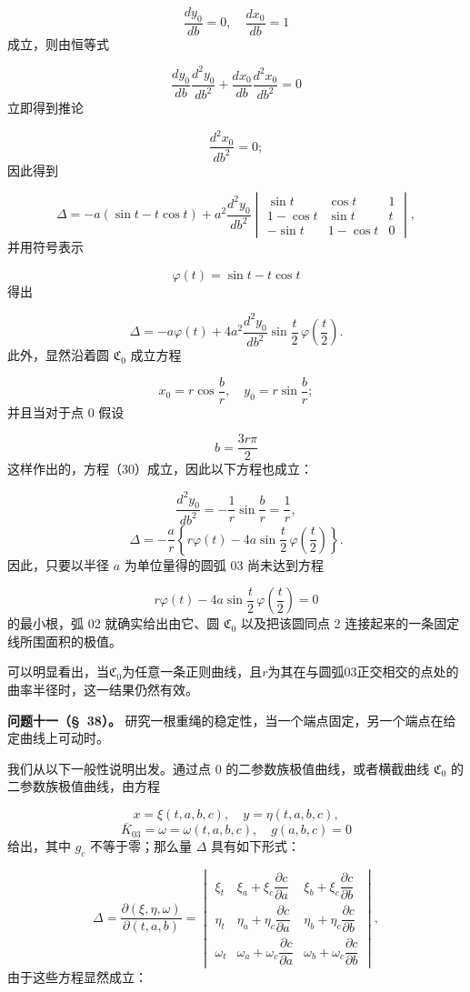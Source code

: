 \documentclass[11pt,a4paper,leqno]{article}
\begin{document}
\begin{equation}\tag{30}
\frac{dy_0}{db}=0,\quad \frac{dx_0}{db}=1
\end{equation}
成立，则由恒等式

\[
\frac{dy_0}{db}\frac{d^2y_0}{db^2}+\frac{dx_0}{db}\frac{d^2x_0}{db^2}=0
\]
立即得到推论

\[
\frac{d^2x_0}{db^2}=0;
\]
因此得到

\[
\Delta=-a(\sin t-t\cos t)+a^2\frac{d^2y_0}{db^2}\begin{vmatrix}
\sin t&\cos t&1\\
1-\cos t&\sin t&t\\
-\sin t&1-\cos t&0
\end{vmatrix},
\]
并用符号表示

\[
\varphi(t)=\sin t-t\cos t
\]
得出

\[
\Delta=-a\varphi(t)+4a^2\frac{d^2y_0}{db^2}\sin\frac{t}{2}\,\varphi\left(\frac{t}{2}\right).
\]
此外，显然沿着圆 $\mathfrak{C}_0$ 成立方程

\[
x_0=r\cos\frac{b}{r},\quad y_0=r\sin\frac{b}{r};
\]
并且当对于点 0 假设

\[
b=\frac{3r\pi}{2}
\]
这样作出的，方程（30）成立，因此以下方程也成立：

\[
\frac{d^2y_0}{db^2}=-\frac{1}{r}\sin\frac{b}{r}=\frac{1}{r},
\]
\[
\Delta=-\frac{a}{r}\left\{r\varphi(t)-4a\sin\frac{t}{2}\,\varphi\left(\frac{t}{2}\right)\right\}.
\]
因此，只要以半径 $a$ 为单位量得的圆弧 03 尚未达到方程

\[
r\varphi(t)-4a\sin\frac{t}{2}\,\varphi\left(\frac{t}{2}\right)=0
\]
的最小根，弧 02 就确实给出由它、圆 $\mathfrak{C}_0$ 以及把该圆同点 2 连接起来的一条固定线所围面积的极值。

可以明显看出，当$\mathfrak{C}_0$为任意一条正则曲线，且$r$为其在与圆弧03正交相交的点处的曲率半径时，这一结果仍然有效。

\noindent\textbf{问题十一（\S~38）。} 研究一根重绳的稳定性，当一个端点固定，另一个端点在给定曲线上可动时。

我们从以下一般性说明出发。通过点 0 的二参数族极值曲线，或者横截曲线 $\mathfrak{C}_0$ 的二参数族极值曲线，由方程

\[
x=\xi(t,a,b,c),\quad y=\eta(t,a,b,c),
\]
\[
\overline{K}_{03}=\omega=\omega(t,a,b,c),\quad g(a,b,c)=0
\]
给出，其中 $g_c$ 不等于零；那么量 $\Delta$ 具有如下形式：

\begingroup
\setlength{\arraycolsep}{1pt}
\[
\Delta=\frac{\partial(\xi,\eta,\omega)}{\partial(t,a,b)}=
\begin{vmatrix}
\xi_t&\xi_a+\xi_c\dfrac{\partial c}{\partial a}&\xi_b+\xi_c\dfrac{\partial c}{\partial b}\\[1.0ex]
\eta_t&\eta_a+\eta_c\dfrac{\partial c}{\partial a}&\eta_b+\eta_c\dfrac{\partial c}{\partial b}\\[1.0ex]
\omega_t&\omega_a+\omega_c\dfrac{\partial c}{\partial a}&\omega_b+\omega_c\dfrac{\partial c}{\partial b}
\end{vmatrix},
\]
由于这些方程显然成立：
\end{document}
